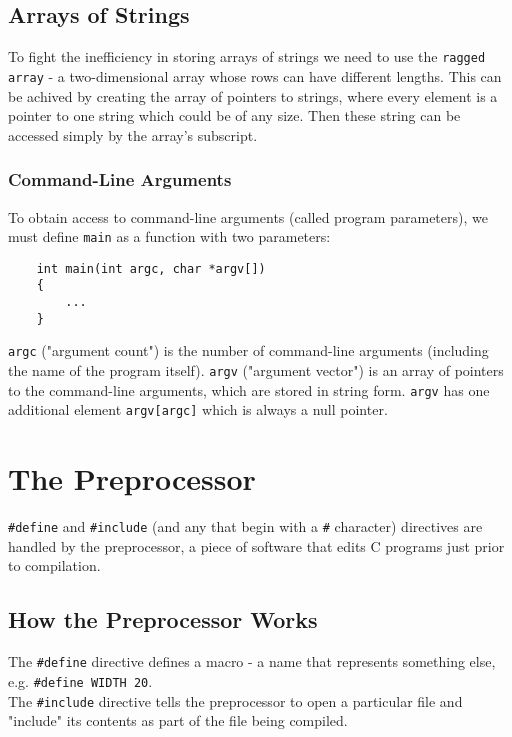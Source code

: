\documentclass[openany]{book}
\begin{document}
    \section{Arrays of Strings}

    To fight the inefficiency in storing arrays of strings we need to use the \texttt{ragged array} - a two-dimensional array whose rows can have different lengths. This can be achived by creating the array of pointers to strings, where every element is a pointer to one string which could be of any size. Then these string can be accessed simply by the array's subscript.

    \subsection*{Command-Line Arguments}

    To obtain access to command-line arguments (called program parameters), we must define \texttt{main} as a function with two parameters:
    \begin{lstlisting}
    int main(int argc, char *argv[])
    {
        ...
    }
    \end{lstlisting}

    \texttt{argc} ("argument count") is the number of command-line arguments (including the name of the program itself). \texttt{argv} ("argument vector") is an array of pointers to the command-line arguments, which are stored in string form. \texttt{argv} has one additional element \texttt{argv[argc]} which is always a null pointer.

    

    \chapter{The Preprocessor}

    \texttt{\#define} and \texttt{\#include} (and any that begin with a \texttt{\#} character) directives are handled by the preprocessor, a piece of software that edits C programs just prior to compilation.

    \section{How the Preprocessor Works}
    
    The \texttt{\#define} directive defines a macro - a name that represents something else, e.g. \texttt{\#define WIDTH 20}. \\
    The \texttt{\#include} directive tells the preprocessor to open a particular file and "include" its contents as part of the file being compiled.
\end{document}
